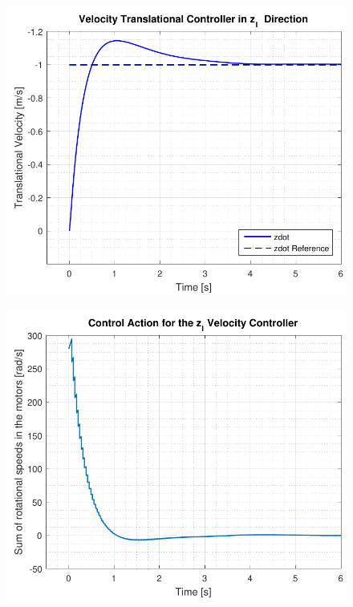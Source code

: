 \begin{minipage}{\linewidth}
    \begin{minipage}{0.45\linewidth}
        \begin{figure}[H]
            \vspace{-.4cm}
            \includegraphics[scale=.45]{figures/velocityControllerZ}
            \centering			
            \label{fig:velocityControllerZ}
        \end{figure}
    \end{minipage}
    \hspace{0.03\linewidth}
    \begin{minipage}{0.45\linewidth}
        \begin{figure}[H]
            \includegraphics[scale=.45]{figures/velocityControllerZAction}

\end{figure}
\end{minipage}
\end{minipage}
